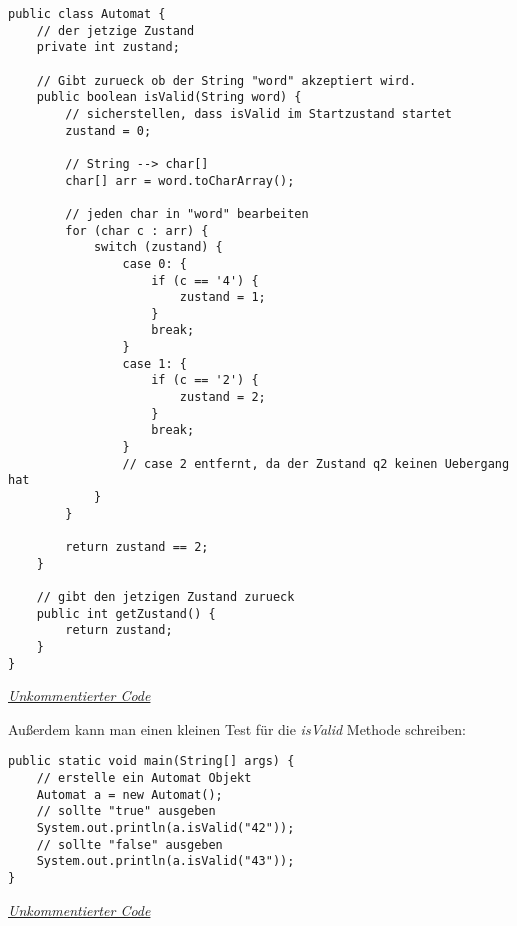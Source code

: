 \begin{center}
\begin{lstlisting}
public class Automat {
    // der jetzige Zustand
    private int zustand;

    // Gibt zurueck ob der String "word" akzeptiert wird.
    public boolean isValid(String word) {
        // sicherstellen, dass isValid im Startzustand startet
        zustand = 0;

        // String --> char[]
        char[] arr = word.toCharArray();

        // jeden char in "word" bearbeiten
        for (char c : arr) {
            switch (zustand) {
                case 0: {
                    if (c == '4') {
                        zustand = 1;
                    }
                    break;
                }
                case 1: {
                    if (c == '2') {
                        zustand = 2;
                    }
                    break;
                }
                // case 2 entfernt, da der Zustand q2 keinen Uebergang hat
            }
        }

        return zustand == 2;
    }

    // gibt den jetzigen Zustand zurueck
    public int getZustand() {
        return zustand;
    }
}
\end{lstlisting}
\href{https://raw.githubusercontent.com/tim-tm/informatik-notes/main/code/Automat.java}{\textit{Unkommentierter Code}} \\
\end{center}

\begin{flushleft}
    Außerdem kann man einen kleinen Test für die \textit{isValid} Methode schreiben:
\end{flushleft}

\begin{center}
\begin{lstlisting}
public static void main(String[] args) {
    // erstelle ein Automat Objekt
    Automat a = new Automat();
    // sollte "true" ausgeben
    System.out.println(a.isValid("42"));
    // sollte "false" ausgeben
    System.out.println(a.isValid("43"));
}
\end{lstlisting}
\href{https://raw.githubusercontent.com/tim-tm/informatik-notes/main/code/Automat.java}{\textit{Unkommentierter Code}} \\
\end{center}
